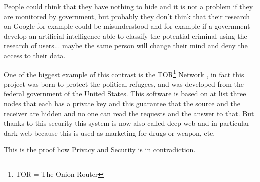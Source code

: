 \documentclass{article}
\begin{document}
    People could think that they have nothing to hide and it is not a problem if they are monitored by government, but probably they don't think that their research on Google for example could be misunderstood and for example if a government develop an artificial intelligence able to classify the potential criminal using the research of users... maybe the same person will change their mind and deny the access to their data.
    
    One of the biggest example of this contrast is the TOR\footnote{TOR = The Onion Router} Network \cite{tor}, in fact this project was born to protect the political refugees, and was developed from the federal government of the United States. This software is based on at list three nodes that each has a private key and this guarantee that the source and the receiver are hidden and no one can read the requests and the answer to that.
    But thanks to this security this system is now also called deep web and in particular dark web because this is used as marketing for drugs or weapon, etc.
    
    This is the proof how Privacy and Security is in contradiction.

    

  

\end{document}
